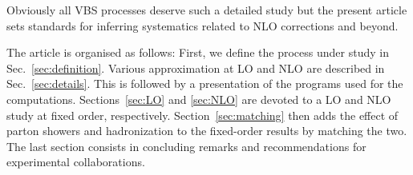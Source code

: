 Obviously all VBS processes deserve such a detailed study but the present article sets standards for inferring systematics related to NLO corrections and beyond.


The article is organised as follows:
First, we define the process under study in Sec.~\ref{sec:definition}.
Various approximation at LO and NLO are described in Sec.~\ref{sec:details}.
This is followed by a presentation of the programs used for the computations.
Sections~\ref{sec:LO} and \ref{sec:NLO} are devoted to a LO and NLO study at fixed order, respectively.
Section~\ref{sec:matching} then adds the effect of parton showers and hadronization to the fixed-order results by matching the two.
The last section consists in concluding remarks and recommendations for experimental collaborations.

